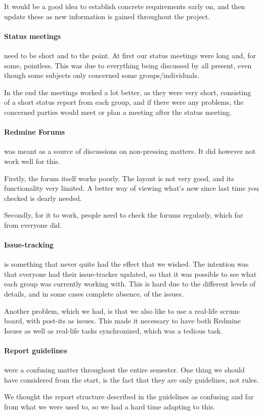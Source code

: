 It would be a good idea to establish concrete requirements early on, and then update these as new information is gained throughout the project.

\paragraph{Status meetings} need to be short and to the point.
At first our status meetings were long and, for some, pointless.
This was due to everything being discussed by all present, even though some subjects only concerned some groups/individuals.

In the end the meetings worked a lot better, as they were very short, consisting of a short status report from each group, and if there were any problems, the concerned parties would meet or plan a meeting after the status meeting.

\paragraph{Redmine Forums} was meant as a source of discussions on non-pressing matters.
It did however not work well for this.

Firstly, the forum itself works poorly.
The layout is not very good, and its functionality very limited.
A better way of viewing what's new since last time you checked is dearly needed.

Secondly, for it to work, people need to check the forums regularly, which far from everyone did.

\paragraph{Issue-tracking} is something that never quite had the effect that we wished.
The intention was that everyone had their issue-tracker updated, so that it was possible to see what each group was currently working with.
This is hard due to the different levels of details, and in some cases complete absence, of the issues.

Another problem, which we had, is that we also like to use a real-life scrum-board, with post-its as issues.
This made it necessary to have both Redmine Issues as well as real-life tasks synchronized, which was a tedious task.

\paragraph{Report guidelines} were a confusing matter throughout the entire semester.
One thing we should have considered from the start, is the fact that they are only guidelines, not rules.

We thought the report structure described in the guidelines as confusing and far from what we were used to, so we had a hard time adapting to this.
